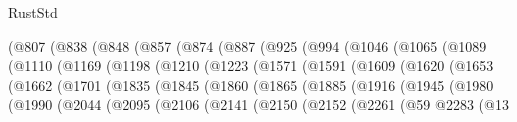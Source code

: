 \begin{lexlean}{RustStd}
\begin{coremodule}
                (@807
                  (@838
                    (@848
                      (@857
                        (@874
                          (@887
                            (@925
                              (@994
                                (@1046
                                  (@1065
                                    (@1089
                                      (@1110
                                        (@1169
                                          (@1198
                                            (@1210
                                              (@1223
                                                (@1571
                                                  (@1591
                                                    (@1609
                                                      (@1620
                                                        (@1653
                                                          (@1662
                                                            (@1701
                                                              (@1835
                                                                (@1845
                                                                  (@1860
                                                                    (@1865
                                                                      (@1885
                                                                        (@1916
                                                                          (@1945
                                                                            (@1980
                                                                              (@1990
                                                                                (@2044
                                                                                  (@2095
                                                                                    (@2106
                                                                                      (@2141
                                                                                        (@2150
                                                                                          (@2152
                                                                                            (@2261
                                                                                              (@59
                                                                                                @2283
                                                                                                (@13

\end{coremodule}
\end{lexlean}
